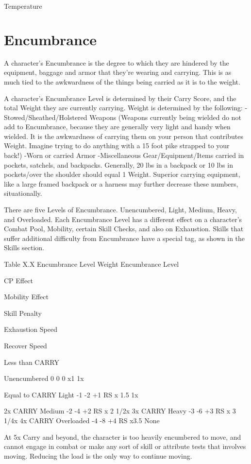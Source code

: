\documentclass[oneside,11pt,english]{book}
\begin{document}
Temperature

\section{Encumbrance}\label{sec:Encumbrance}
A character’s Encumbrance is the degree to which they are hindered by the equipment, baggage and 
armor that they’re wearing and carrying. This is as much tied to the awkwardness of the things being carried as it is to the weight.

A character’s Encumbrance Level is determined by their Carry Score, and the total Weight they are 
currently carrying. Weight is determined by the following: 
-Stowed/Sheathed/Holstered Weapons (Weapons currently being wielded do not add to Encumbrance, 
because they are generally very light and handy when wielded. It is the awkwardness of carrying them on 
your person that contributes Weight. Imagine trying to do anything with a 15 foot pike strapped to your 
back!)
-Worn or carried Armor 
-Miscellaneous Gear/Equipment/Items carried in pockets, satchels, and backpacks. Generally, 20 lbs in 
a backpack or 10 lbs in pockets/over the shoulder should equal 1 Weight. Superior carrying equipment, 
like a large framed backpack or a harness may further decrease these numbers, situationally. 

 

There are five Levels of Encumbrance. Unencumbered, Light, Medium, Heavy, and Overloaded. 
Each Encumbrance Level has a different effect on a character’s Combat Pool, Mobility, certain Skill 
Checks, and also on Exhaustion. 
Skills that suffer additional difficulty from Encumbrance have a special tag, as shown in the Skills 
section. 

 

Table X.X Encumbrance Level 
Weight Encumbrance 
Level 

CP 
Effect 

Mobility 
Effect 

Skill 
Penalty 

Exhaustion 
Speed 

Recover 
Speed 

Less than 
CARRY 

Unencumbered 0 0 0 x1 1x 

Equal to CARRY Light -1 -2 +1 RS x 1.5 1x 


2x CARRY Medium -2 -4 +2 RS x 2 1/2x 
3x CARRY Heavy -3 -6 +3 RS x 3 1/4x 
4x CARRY Overloaded -4 -8 +4 RS x3.5 None 

 
At 5x Carry and beyond, the character is too heavily encumbered to move, and cannot engage in combat 
or make any sort of skill or attribute tests that involves moving. Reducing the load is the only way to 
continue moving. 
\end{document}
